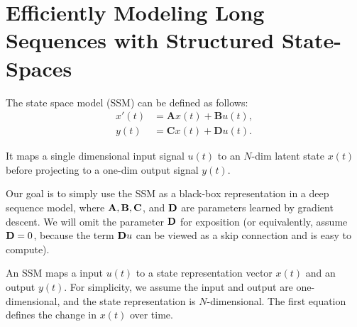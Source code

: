 


\section{Efficiently Modeling Long Sequences with Structured State-Spaces}
\label{sec:}
The state space model (SSM) can be defined as follows:
\begin{align*}
	x'(t) &= \mathbf{A}x(t)+\mathbf{B}u(t),\\
	y(t) &= \mathbf{C}x(t)+\mathbf{D}u(t).
\end{align*}

It maps a single dimensional input signal $u(t)$ to an $N$-dim latent state $x(t)$ before projecting to a one-dim output signal $y(t)$.  

Our goal is to simply use the SSM as a black-box representation in a deep sequence model, where ${\mathbf{A}}, {\mathbf{B}}, {\mathbf{C}}$, and ${\mathbf{D}}$ are parameters learned by gradient descent. We will omit the parameter ${\mathbf{D}}$ for exposition (or equivalently, assume ${\mathbf{D}}=0$, because the term ${\mathbf{D}} u$ can be viewed as a skip connection and is easy to compute).

An SSM maps a input $u(t)$ to a state representation vector $x(t)$ and an output $y(t)$. For simplicity, we assume the input and output are one-dimensional, and the state representation is $N$-dimensional. The first equation defines the change in $x(t)$ over time.

